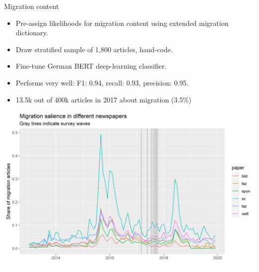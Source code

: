 \documentclass[
  ignorenonframetext,
]{beamer}
\providecommand{\tightlist}{%
  \setlength{\itemsep}{0pt}\setlength{\parskip}{0pt}}
\begin{document}
\begin{frame}[allowframebreaks]{Migration content}
\protect\hypertarget{migration-content}{}
\begin{itemize}
\tightlist
\item
  Pre-assign likelihoods for migration content using extended migration
  dictionary.
\item
  Draw stratified sample of 1,800 articles, hand-code.
\item
  Fine-tune German BERT deep-learning classifier.
\item
  Performs very well: F1: 0.94, recall: 0.93, precision: 0.95.
\item
  13.5k out of 400k articles in 2017 about migration (3.5\%)
\end{itemize}

\framebreak

\includegraphics{vis/salience_papers.png}
\end{frame}
\end{document}
